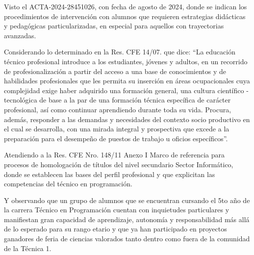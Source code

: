 Visto el ACTA-2024-28451026, con fecha de agosto de 2024, donde se indican los procedimientos de intervención con  alumnos que requieren estrategias didácticas y pedagógicas particularizadas, en especial para aquellos con trayectorias avanzadas.

Considerando lo determinado en la Res. CFE 14/07. que dice: “La educación técnico profesional introduce a los estudiantes, jóvenes y adultos, en un recorrido de profesionalización a partir del acceso a una base de conocimientos y de habilidades profesionales que les permita su inserción en áreas ocupacionales cuya complejidad exige haber adquirido una formación general, una cultura científico - tecnológica de base a la par de una formación técnica específica de carácter profesional, así como continuar aprendiendo durante toda su vida. Procura, además, responder a las demandas y necesidades del contexto socio productivo en el cual se desarrolla, con una mirada integral y prospectiva que excede a la preparación para el desempeño de puestos de trabajo u oficios específicos”.

Atendiendo a la Res. CFE Nro. 148/11 Anexo I Marco de referencia para procesos de homologación de títulos del nivel secundario Sector Informático, donde se establecen las bases del perfil profesional y que explicitan las competencias del técnico en programación.

Y observando que un grupo de alumnos que se encuentran cursando el 5to año de la carrera Técnico en Programación cuentan con inquietudes particulares y manifiestan gran capacidad de aprendizaje, autonomía y responsabilidad más allá de lo esperado para su rango etario y que ya han participado en proyectos ganadores de feria de ciencias valorados tanto dentro como fuera de la comunidad de la Técnica 1.


